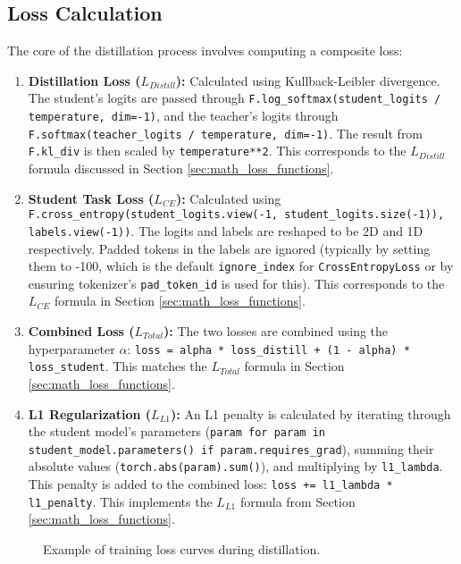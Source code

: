 \documentclass[12pt, a4paper]{report}
\begin{document}
\subsection{Loss Calculation}
The core of the distillation process involves computing a composite loss:
\begin{enumerate}
    \item \textbf{Distillation Loss ($L_{Distill}$):}
    Calculated using Kullback-Leibler divergence. The student's logits are passed through \texttt{F.log\_softmax(student\_logits / temperature, dim=-1)}, and the teacher's logits through \texttt{F.softmax(teacher\_logits / temperature, dim=-1)}. The result from \texttt{F.kl\_div} is then scaled by \texttt{temperature**2}. This corresponds to the $L_{Distill}$ formula discussed in Section \ref{sec:math_loss_functions}.
    \item \textbf{Student Task Loss ($L_{CE}$):}
    Calculated using \texttt{F.cross\_entropy(student\_logits.view(-1, student_logits.size(-1)), labels.view(-1))}. The logits and labels are reshaped to be 2D and 1D respectively. Padded tokens in the labels are ignored (typically by setting them to -100, which is the default \texttt{ignore\_index} for \texttt{CrossEntropyLoss} or by ensuring tokenizer's \texttt{pad\_token\_id} is used for this). This corresponds to the $L_{CE}$ formula in Section \ref{sec:math_loss_functions}.
    \item \textbf{Combined Loss ($L_{Total}$):}
    The two losses are combined using the hyperparameter $\alpha$: \texttt{loss = alpha * loss\_distill + (1 - alpha) * loss\_student}. This matches the $L_{Total}$ formula in Section \ref{sec:math_loss_functions}.
    \item \textbf{L1 Regularization ($L_{L1}$):}
    An L1 penalty is calculated by iterating through the student model's parameters (\texttt{param for param in student\_model.parameters() if param.requires\_grad}), summing their absolute values (\texttt{torch.abs(param).sum()}), and multiplying by \texttt{l1\_lambda}. This penalty is added to the combined loss: \texttt{loss += l1\_lambda * l1\_penalty}. This implements the $L_{L1}$ formula from Section \ref{sec:math_loss_functions}.
\end{enumerate}

\begin{figure}[h!]
\centering
\caption{Example of training loss curves during distillation.}
\label{fig:loss_curve}
\end{figure}
\end{document}
